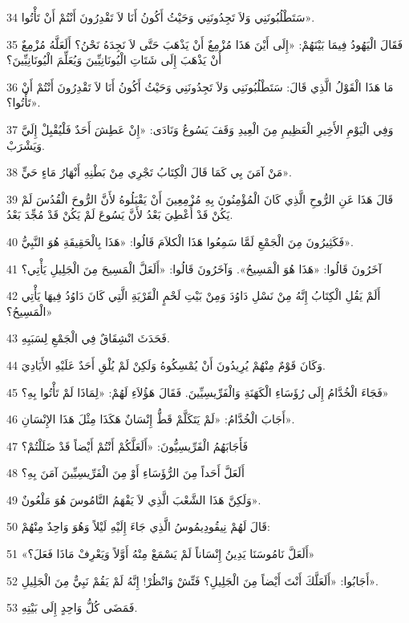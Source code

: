 \par 34 سَتَطْلُبُونَنِي وَلاَ تَجِدُونَنِي وَحَيْثُ أَكُونُ أَنَا لاَ تَقْدِرُونَ أَنْتُمْ أَنْ تَأْتُوا».
\par 35 فَقَالَ الْيَهُودُ فِيمَا بَيْنَهُمْ: «إِلَى أَيْنَ هَذَا مُزْمِعٌ أَنْ يَذْهَبَ حَتَّى لاَ نَجِدَهُ نَحْنُ؟ أَلَعَلَّهُ مُزْمِعٌ أَنْ يَذْهَبَ إِلَى شَتَاتِ الْيُونَانِيِّينَ وَيُعَلِّمَ الْيُونَانِيِّينَ؟
\par 36 مَا هَذَا الْقَوْلُ الَّذِي قَالَ: سَتَطْلُبُونَنِي وَلاَ تَجِدُونَنِي وَحَيْثُ أَكُونُ أَنَا لاَ تَقْدِرُونَ أَنْتُمْ أَنْ تَأْتُوا؟».
\par 37 وَفِي الْيَوْمِ الأَخِيرِ الْعَظِيمِ مِنَ الْعِيدِ وَقَفَ يَسُوعُ وَنَادَى: «إِنْ عَطِشَ أَحَدٌ فَلْيُقْبِلْ إِلَيَّ وَيَشْرَبْ.
\par 38 مَنْ آمَنَ بِي كَمَا قَالَ الْكِتَابُ تَجْرِي مِنْ بَطْنِهِ أَنْهَارُ مَاءٍ حَيٍّ».
\par 39 قَالَ هَذَا عَنِ الرُّوحِ الَّذِي كَانَ الْمُؤْمِنُونَ بِهِ مُزْمِعِينَ أَنْ يَقْبَلُوهُ لأَنَّ الرُّوحَ الْقُدُسَ لَمْ يَكُنْ قَدْ أُعْطِيَ بَعْدُ لأَنَّ يَسُوعَ لَمْ يَكُنْ قَدْ مُجِّدَ بَعْدُ.
\par 40 فَكَثِيرُونَ مِنَ الْجَمْعِ لَمَّا سَمِعُوا هَذَا الْكلاَمَ قَالُوا: «هَذَا بِالْحَقِيقَةِ هُوَ النَّبِيُّ».
\par 41 آخَرُونَ قَالُوا: «هَذَا هُوَ الْمَسِيحُ». وَآخَرُونَ قَالُوا: «أَلَعَلَّ الْمَسِيحَ مِنَ الْجَلِيلِ يَأْتِي؟
\par 42 أَلَمْ يَقُلِ الْكِتَابُ إِنَّهُ مِنْ نَسْلِ دَاوُدَ وَمِنْ بَيْتِ لَحْمٍ الْقَرْيَةِ الَّتِي كَانَ دَاوُدُ فِيهَا يَأْتِي الْمَسِيحُ؟»
\par 43 فَحَدَثَ انْشِقَاقٌ فِي الْجَمْعِ لِسَبَبِهِ.
\par 44 وَكَانَ قَوْمٌ مِنْهُمْ يُرِيدُونَ أَنْ يُمْسِكُوهُ وَلَكِنْ لَمْ يُلْقِ أَحَدٌ عَلَيْهِ الأَيَادِيَ.
\par 45 فَجَاءَ الْخُدَّامُ إِلَى رُؤَسَاءِ الْكَهَنَةِ وَالْفَرِّيسِيِّينَ. فَقَالَ هَؤُلاَءِ لَهُمْ: «لِمَاذَا لَمْ تَأْتُوا بِهِ؟»
\par 46 أَجَابَ الْخُدَّامُ: «لَمْ يَتَكَلَّمْ قَطُّ إِنْسَانٌ هَكَذَا مِثْلَ هَذَا الإِنْسَانِ».
\par 47 فَأَجَابَهُمُ الْفَرِّيسِيُّونَ: «أَلَعَلَّكُمْ أَنْتُمْ أَيْضاً قَدْ ضَلَلْتُمْ؟
\par 48 أَلَعَلَّ أَحَداً مِنَ الرُّؤَسَاءِ أَوْ مِنَ الْفَرِّيسِيِّينَ آمَنَ بِهِ؟
\par 49 وَلَكِنَّ هَذَا الشَّعْبَ الَّذِي لاَ يَفْهَمُ النَّامُوسَ هُوَ مَلْعُونٌ».
\par 50 قَالَ لَهُمْ نِيقُودِيمُوسُ الَّذِي جَاءَ إِلَيْهِ لَيْلاً وَهُوَ وَاحِدٌ مِنْهُمْ:
\par 51 «أَلَعَلَّ نَامُوسَنَا يَدِينُ إِنْسَاناً لَمْ يَسْمَعْ مِنْهُ أَوَّلاً وَيَعْرِفْ مَاذَا فَعَلَ؟»
\par 52 أَجَابُوا: «أَلَعَلَّكَ أَنْتَ أَيْضاً مِنَ الْجَلِيلِ؟ فَتِّشْ وَانْظُرْ! إِنَّهُ لَمْ يَقُمْ نَبِيٌّ مِنَ الْجَلِيلِ».
\par 53 فَمَضَى كُلُّ وَاحِدٍ إِلَى بَيْتِهِ.

